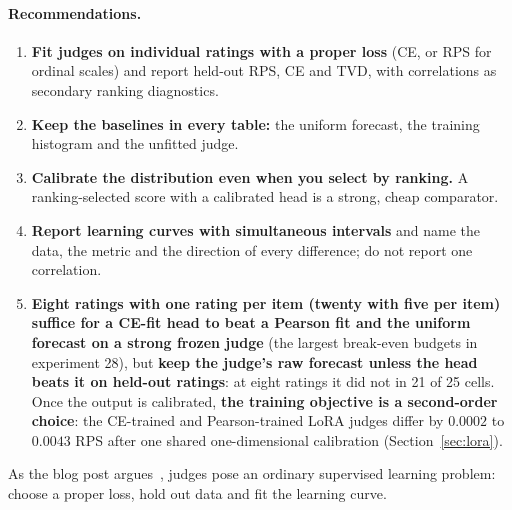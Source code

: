 \paragraph{Recommendations.}
\begin{enumerate}
\item \textbf{Fit judges on individual ratings with a proper loss} (CE, or RPS for ordinal scales) and report held-out RPS, CE and TVD, with correlations as secondary ranking diagnostics.
\item \textbf{Keep the baselines in every table:} the uniform forecast, the training histogram and the unfitted judge.
\item \textbf{Calibrate the distribution even when you select by ranking.} A ranking-selected score with a calibrated head is a strong, cheap comparator.
\item \textbf{Report learning curves with simultaneous intervals} and name the data, the metric and the direction of every difference; do not report one correlation.
\item \textbf{Eight ratings with one rating per item (twenty with five per item) suffice for a CE-fit head to beat a Pearson fit and the uniform forecast on a strong frozen judge} (the largest break-even budgets in experiment 28), but \textbf{keep the judge's raw forecast unless the head beats it on held-out ratings}: at eight ratings it did not in 21 of 25 cells.
Once the output is calibrated, \textbf{the training objective is a second-order choice}: the CE-trained and Pearson-trained LoRA judges differ by $0.0002$ to $0.0043$ RPS after one shared one-dimensional calibration (Section~\ref{sec:lora}).
\end{enumerate}
As the blog post argues~\citep{miranda2026bitter}, judges pose an ordinary supervised learning problem: choose a proper loss, hold out data and fit the learning curve.
